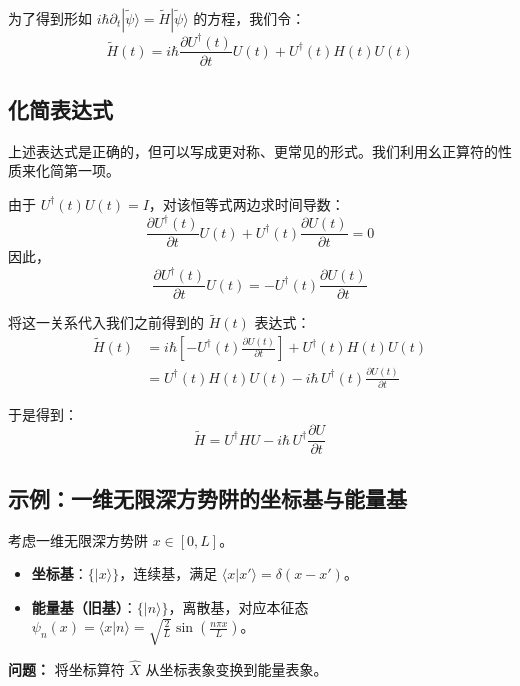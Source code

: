 为了得到形如 \(i\hbar \partial_t |\tilde{\psi}\rangle = \tilde{H} |\tilde{\psi}\rangle\) 的方程，我们令：
\[
\tilde{H}(t) = i\hbar \frac{\partial U^{\dagger}(t)}{\partial t} U(t) + U^{\dagger}(t) H(t) U(t)
\]

\subsection*{ 化简表达式}

上述表达式是正确的，但可以写成更对称、更常见的形式。我们利用幺正算符的性质来化简第一项。

由于 \(U^{\dagger}(t)U(t) = I\)，对该恒等式两边求时间导数：
\[
\frac{\partial U^{\dagger}(t)}{\partial t} U(t) + U^{\dagger}(t) \frac{\partial U(t)}{\partial t} = 0
\]
因此，
\[
\frac{\partial U^{\dagger}(t)}{\partial t} U(t) = - U^{\dagger}(t) \frac{\partial U(t)}{\partial t}
\]

将这一关系代入我们之前得到的 \(\tilde{H}(t)\) 表达式：
\[
\begin{aligned}
	\tilde{H}(t) &= i\hbar \left[ - U^{\dagger}(t) \frac{\partial U(t)}{\partial t} \right] + U^{\dagger}(t) H(t) U(t) \\
	&= U^{\dagger}(t) H(t) U(t) - i\hbar\, U^{\dagger}(t) \frac{\partial U(t)}{\partial t}
\end{aligned}
\]

于是得到：
\[
\boxed{\tilde{H} = U^{\dagger} H U - i\hbar\, U^{\dagger} \frac{\partial U}{\partial t}}
\]
\subsection{示例：一维无限深方势阱的坐标基与能量基}
考虑一维无限深方势阱 $x \in [0, L]$。
\begin{itemize}
	\item \textbf{坐标基}：$\{ |x\rangle \}$，连续基，满足 $\langle x | x' \rangle = \delta(x - x')$。
	\item \textbf{能量基（旧基）}：$\{ |n\rangle \}$，离散基，对应本征态 $\psi_n(x) = \langle x | n \rangle = \sqrt{\frac{2}{L}} \sin\left( \frac{n\pi x}{L} \right)$。
\end{itemize}

\textbf{问题：} 将坐标算符 $\hat{X}$ 从坐标表象变换到能量表象。

